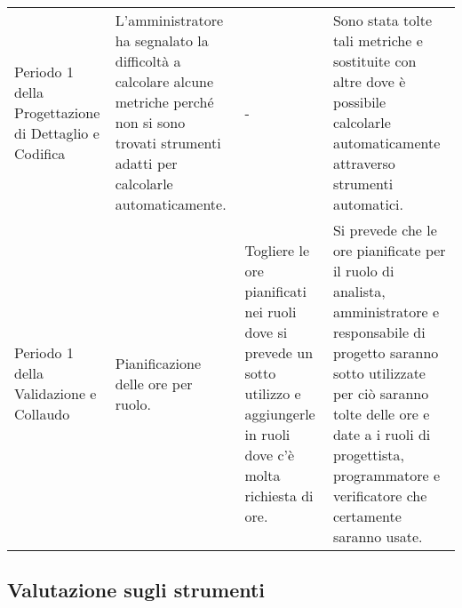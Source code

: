 {\begin{longtable}{ C{3cm} C{4cm} C{3cm} C{4cm}}
		Periodo 1 della Progettazione di Dettaglio e Codifica & L'amministratore ha segnalato la difficoltà a calcolare alcune metriche perché non si sono trovati strumenti adatti per calcolarle automaticamente. & - & Sono stata tolte tali metriche e sostituite con altre dove è possibile calcolarle automaticamente attraverso strumenti automatici. \\
		
		Periodo 1 della Validazione e Collaudo & Pianificazione delle ore per ruolo. & Togliere le ore pianificati nei ruoli dove si prevede un sotto utilizzo e aggiungerle in ruoli dove c'è molta richiesta di ore. & Si prevede che le ore pianificate per il ruolo di analista, amministratore e responsabile di progetto saranno sotto utilizzate per ciò saranno tolte delle ore e date a i ruoli di progettista, programmatore e verificatore che certamente saranno usate.
		
		
	\end{longtable}
}

\subsection{Valutazione sugli strumenti}

